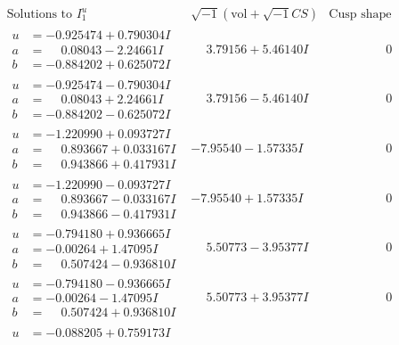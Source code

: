\documentclass[1p]{elsarticle_modified}
\theoremstyle{definition}
\newcommand{\I}{\sqrt{-1}}
\begin{document}
$$\begin{array}{c|c|c}
\text{Solutions to }I^u_{1}& \I (\text{vol} + \sqrt{-1}CS) & \text{Cusp shape}\\
 \hline 
\begin{aligned}
u &= -0.925474 + 0.790304 I \\
a &= \phantom{-}0.08043 - 2.24661 I \\
b &= -0.884202 + 0.625072 I\end{aligned}
 & \phantom{-}3.79156 + 5.46140 I & \phantom{-0.000000 } 0 \\ \hline\begin{aligned}
u &= -0.925474 - 0.790304 I \\
a &= \phantom{-}0.08043 + 2.24661 I \\
b &= -0.884202 - 0.625072 I\end{aligned}
 & \phantom{-}3.79156 - 5.46140 I & \phantom{-0.000000 } 0 \\ \hline\begin{aligned}
u &= -1.220990 + 0.093727 I \\
a &= \phantom{-}0.893667 + 0.033167 I \\
b &= \phantom{-}0.943866 + 0.417931 I\end{aligned}
 & -7.95540 - 1.57335 I & \phantom{-0.000000 } 0 \\ \hline\begin{aligned}
u &= -1.220990 - 0.093727 I \\
a &= \phantom{-}0.893667 - 0.033167 I \\
b &= \phantom{-}0.943866 - 0.417931 I\end{aligned}
 & -7.95540 + 1.57335 I & \phantom{-0.000000 } 0 \\ \hline\begin{aligned}
u &= -0.794180 + 0.936665 I \\
a &= -0.00264 + 1.47095 I \\
b &= \phantom{-}0.507424 - 0.936810 I\end{aligned}
 & \phantom{-}5.50773 - 3.95377 I & \phantom{-0.000000 } 0 \\ \hline\begin{aligned}
u &= -0.794180 - 0.936665 I \\
a &= -0.00264 - 1.47095 I \\
b &= \phantom{-}0.507424 + 0.936810 I\end{aligned}
 & \phantom{-}5.50773 + 3.95377 I & \phantom{-0.000000 } 0 \\ \hline\begin{aligned}
u &= -0.088205 + 0.759173 I \\

\end{aligned}
\end{array}$$
\end{document}

